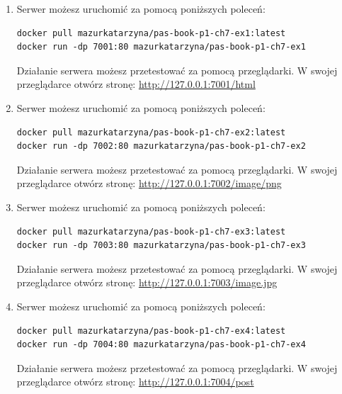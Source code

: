 \begin{enumerate}[label=\textbf{7.\arabic*}]\setlength{\itemsep}{1em}
\item Serwer możesz uruchomić za pomocą poniższych poleceń:

\begin{verbatim}
docker pull mazurkatarzyna/pas-book-p1-ch7-ex1:latest
docker run -dp 7001:80 mazurkatarzyna/pas-book-p1-ch7-ex1
\end{verbatim}

\noindent Działanie serwera możesz przetestować za pomocą przeglądarki. W swojej przeglądarce otwórz stronę: \url{http://127.0.0.1:7001/html}

\item Serwer możesz uruchomić za pomocą poniższych poleceń:

\begin{verbatim}
docker pull mazurkatarzyna/pas-book-p1-ch7-ex2:latest
docker run -dp 7002:80 mazurkatarzyna/pas-book-p1-ch7-ex2
\end{verbatim}

\noindent Działanie serwera możesz przetestować za pomocą przeglądarki. W swojej przeglądarce otwórz stronę: \url{http://127.0.0.1:7002/image/png}

\item Serwer możesz uruchomić za pomocą poniższych poleceń:

\begin{verbatim}
docker pull mazurkatarzyna/pas-book-p1-ch7-ex3:latest
docker run -dp 7003:80 mazurkatarzyna/pas-book-p1-ch7-ex3
\end{verbatim}

\noindent Działanie serwera możesz przetestować za pomocą przeglądarki. W swojej przeglądarce otwórz stronę: \url{http://127.0.0.1:7003/image.jpg}

\item Serwer możesz uruchomić za pomocą poniższych poleceń:

\begin{verbatim}
docker pull mazurkatarzyna/pas-book-p1-ch7-ex4:latest
docker run -dp 7004:80 mazurkatarzyna/pas-book-p1-ch7-ex4
\end{verbatim}

\noindent Działanie serwera możesz przetestować za pomocą przeglądarki. W swojej przeglądarce otwórz stronę: \url{http://127.0.0.1:7004/post}


\end{enumerate}
